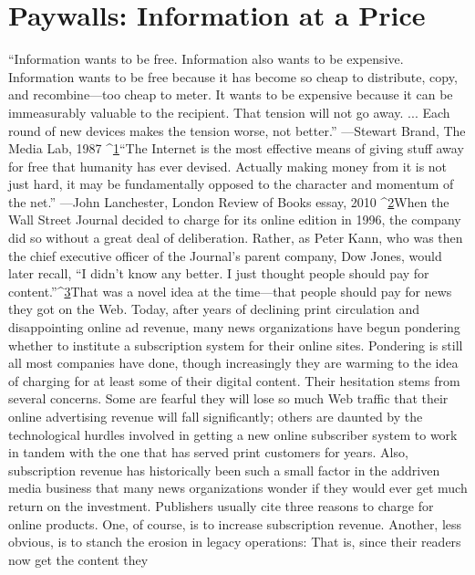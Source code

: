 \chapter{Paywalls: Information at a Price}
``Information wants to be free. Information also wants to be expensive. Information
wants to be free because it has become so cheap to distribute, copy,
and recombine—too cheap to meter. It wants to be expensive because it can be
immeasurably valuable to the recipient. That tension will not go away. ... Each
round of new devices makes the tension worse, not better.''
—Stewart Brand, The Media Lab, 1987 ^{\href{#endnotes-chapter-5}{1}}``The Internet is the most effective means of giving stuff away for free that
humanity has ever devised. Actually making money from it is not just hard, it
may be fundamentally opposed to the character and momentum of the net.''
—John Lanchester, London Review of Books essay, 2010 ^{\href{#endnotes-chapter-5}{2}}When the Wall Street Journal decided to charge for its online edition in 1996,
the company did so without a great deal of deliberation. Rather, as Peter Kann,
who was then the chief executive officer of the Journal's parent company, Dow
Jones, would later recall, ``I didn't know any better. I just thought people should
pay for content.''^{\href{#endnotes-chapter-5}{3}}That was a novel idea at the time—that people should pay for news they got
on the Web. Today, after years of declining print circulation and disappointing
online ad revenue, many news organizations have begun pondering whether to
institute a subscription system for their online sites.
Pondering is still all most companies have done, though increasingly they are
warming to the idea of charging for at least some of their digital content. Their
hesitation stems from several concerns. Some are fearful they will lose so much
Web traffic that their online advertising revenue will fall significantly; others are
daunted by the technological hurdles involved in getting a new online subscriber
system to work in tandem with the one that has served print customers for years.
Also, subscription revenue has historically been such a small factor in the addriven
media business that many news organizations wonder if they would ever
get much return on the investment.
Publishers usually cite three reasons to charge for online products. One, of
course, is to increase subscription revenue. Another, less obvious, is to stanch the
erosion in legacy operations: That is, since their readers now get the content they
